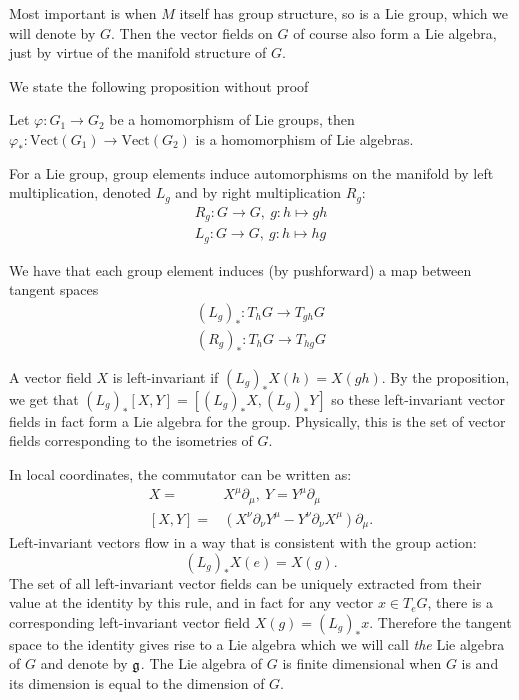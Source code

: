 		Most important is when $M$ itself has group structure, so is a Lie group, which we will denote by $G$. Then the vector fields on $G$ of course also form a Lie algebra, just by virtue of the manifold structure of $G$. 
		
		We state the following proposition without proof
		\begin{prop}
			Let $\varphi: G_1 \rightarrow G_2$ be a homomorphism of Lie groups, then $\varphi_*: \mathrm{Vect}(G_1) \rightarrow \mathrm{Vect}(G_2)$ is a homomorphism of Lie algebras. 
		\end{prop}
		
		For a Lie group, group elements induce automorphisms on the manifold by left multiplication, denoted $L_g$ and by right multiplication $R_g$:
		\begin{equation}
			\begin{aligned}
				R_g: G \rightarrow G, ~ g: h \mapsto gh\\
				L_g: G \rightarrow G, ~ g: h \mapsto hg
			\end{aligned}
		\end{equation}
		
		 We have that each group element induces (by pushforward) a map between tangent spaces 
		 \begin{equation}
		 	\begin{aligned}
		 		(L_g)_*: T_h G \rightarrow T_{gh} G\\
				(R_g)_*: T_h G \rightarrow T_{hg} G
		 	\end{aligned}
		 \end{equation}
		
		A vector field $X$ is left-invariant if $(L_g)_* X(h) = X(gh)$. 
		By the proposition, we get that $(L_g)_* [X, Y] = [(L_g)_* X, (L_g)_* Y]$ so these left-invariant vector fields in fact form a Lie algebra for the group. Physically, this is the set of vector fields corresponding to the isometries of $G$.
		
		In local coordinates, the commutator can be written as:
		\begin{equation}
			\begin{aligned}
				X = &X^\mu \partial_\mu, ~ Y = Y^\mu \partial_\mu\\
				[X,Y] = &(X^\nu \partial_\nu Y^\mu - Y^\nu \partial_\nu X^\mu) \partial_\mu.
			\end{aligned}
		\end{equation}
		Left-invariant vectors flow in a way that is consistent with the group action:
		\begin{equation}
			(L_g)_* X(e) = X(g).
		\end{equation}
		The set of all left-invariant vector fields can be uniquely extracted from their value at the identity by this rule, and in fact for any vector $x \in T_e G$, there is a corresponding left-invariant vector field $X(g) = (L_g)_* x$. Therefore the tangent space to the identity gives rise to a Lie algebra which we will call \emph{the} Lie algebra of $G$ and denote by $\frak g$. The Lie algebra of $G$ is finite dimensional when $G$ is and its dimension is equal to the dimension of $G$.
		

